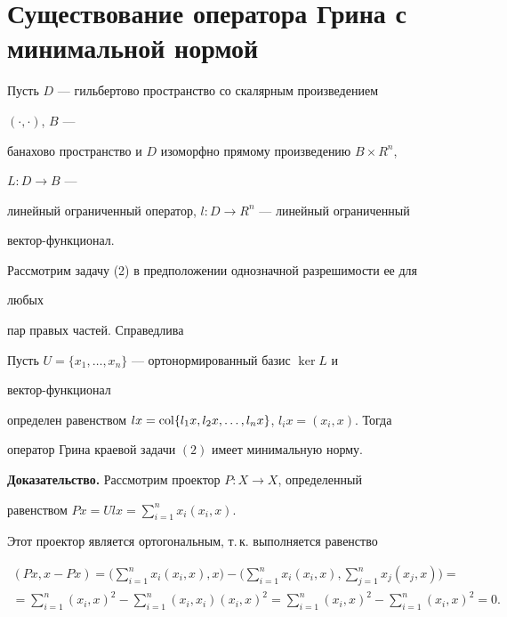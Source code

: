 \section{Существование оператора Грина с минимальной нормой} 


 


Пусть $D$ --- гильбертово пространство со скалярным произведением 


$(\cdot,\cdot)$, $B$ --- 


банахово пространство и $D$ изоморфно прямому произведению $B\times R^n$, 


$L:D\to B$ --- 


линейный ограниченный оператор, $l:D\to R^n$ --- линейный ограниченный  


вектор-функционал. 


 


Рассмотрим задачу (2) в предположении однозначной разрешимости ее для 


любых  


пар правых частей. Справедлива 


 


\begin{thm} 


Пусть $U=\{x_1,\dotsc,x_n\}$ --- ортонормированный базис $\ker L$ и 


вектор-функ\-ци\-о\-нал  


определен равенством $l x=\col\{l_1x,l_2x,\dotsc,l_n x\}$, $l_i 


x=(x_i,x)$. Тогда 


оператор Грина краевой задачи $(2)$ имеет минимальную норму. 


\end{thm} 


 


{\bf Доказательство.} Рассмотрим проектор $P:X\to X$, определенный  


равенством $P x=U l x=\sum\limits^n_{i=1}x_i(x_i,x)$. 


Этот проектор является ортогональным, т.\,к. выполняется равенство 


\begin{multline*} 


(P x,x-P x)=\bigg(\sum^n_{i=1}x_i(x_i,x),x\bigg)-\bigg( 


\sum^n_{i=1}x_i(x_i,x),\sum^n_{j=1}x_j(x_j,x)\bigg)= \\ 


% 


=\sum^n_{i=1}(x_i,x)^2-\sum^n_{i=1} 


(x_i,x_i)(x_i,x)^2=\sum^n_{i=1}(x_i,x)^2- 


\sum^n_{i=1}(x_i,x)^2=0. 


\end{multline*} 


